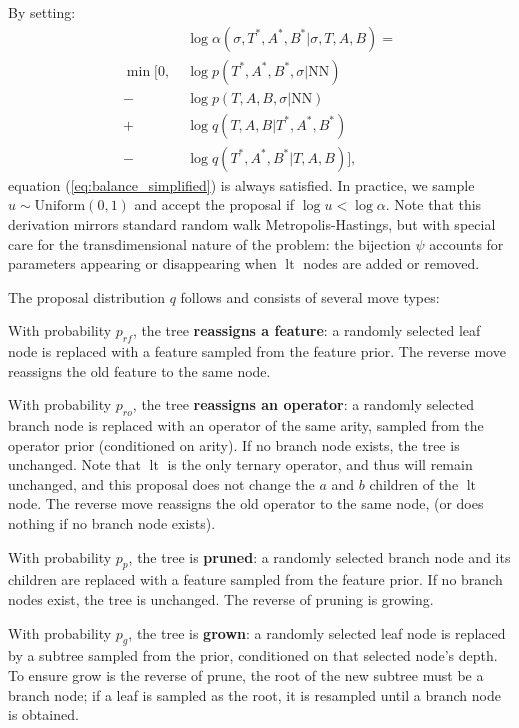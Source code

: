 \documentclass{ifacconf}
\DeclareMathOperator{\lt}{lt}
\begin{document}
	By setting:
	\begin{equation}
		\begin{aligned}
			&\log \alpha(\sigma, T^*, A^*, B^* | \sigma, T, A, B) = \\
			\min [ 0,\; &\log p(T^*, A^*, B^*, \sigma|\text{NN})\\
			-&  \log p(T, A, B, \sigma|\text{NN})\\
			+& \log q(T, A, B | T^*, A^*, B^*)\\
			-&  \log q(T^*, A^*, B^* | T, A, B)],
		\end{aligned}
	\end{equation}
	equation (\ref{eq:balance_simplified}) is always satisfied.
	In practice, we sample $u \sim \text{Uniform}(0,1)$ and accept the proposal if $\log u < \log \alpha$.
	Note that this derivation mirrors standard random walk Metropolis-Hastings, but with special care for the transdimensional nature of the problem: the bijection $\psi$ accounts for parameters appearing or disappearing when $\lt$ nodes are added or removed.
	
	The proposal distribution $q$ follows \citet{jin} and consists of several move types:
	
	With probability $p_{rf}$, the tree \textbf{reassigns a feature}: a randomly selected leaf node is replaced with a feature sampled from the feature prior.
	The reverse move reassigns the old feature to the same node.
	
	With probability $p_{ro}$, the tree \textbf{reassigns an operator}: a randomly selected branch node is replaced with an operator of the same arity, sampled from the operator prior (conditioned on arity).
	If no branch node exists, the tree is unchanged.
	Note that $\lt$ is the only ternary operator, and thus will remain unchanged,
	and this proposal does not change the $a$ and $b$ children of the $\lt$ node.
	The reverse move reassigns the old operator to the same node,
	(or does nothing if no branch node exists).
	
	With probability $p_p$, the tree is \textbf{pruned}: a randomly selected branch node and its children are replaced with a feature sampled from the feature prior.
	If no branch nodes exist, the tree is unchanged.
	The reverse of pruning is growing.
	
	With probability $p_g$, the tree is \textbf{grown}: a randomly selected leaf node is replaced by a subtree sampled from the prior, conditioned on that selected node's depth.
	To ensure grow is the reverse of prune, the root of the new subtree must be a branch node; if a leaf is sampled as the root, it is resampled until a branch node is obtained.
	
\end{document}
